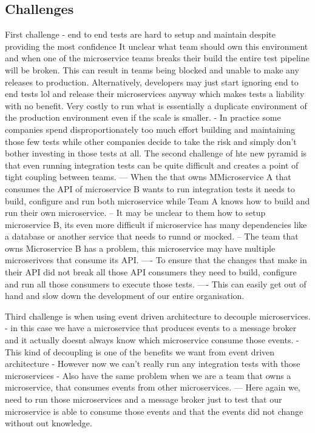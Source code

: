 \documentclass[a4paper, 11pt]{book}
\begin{document}
{    \subsection{Challenges}
    First challenge - end to end tests are hard to setup and maintain despite providing the most confidence
    It unclear what team should own this environment and when one of the microservice teams breaks their build the entire test pipeline will be broken.
    This can result in teams being blocked and unable to make any releases to production.
    Alternatively, developers may just start ignoring end to end tests lol and release their microservices anyway which makes tests a liability with no benefit.
    Very costly to run what is essentially a duplicate environment of the production environment even if the scale is smaller.
    - In practice some companies spend disproportionately too much effort building and maintaining those few tests while other companies decide to take the risk and simply don't bother investing in those tests at all.
    The second challenge of hte new pyramid is that even running integration tests can be quite difficult and creates a point of tight coupling between teams.
    --- When the that owns MMicroservice A that consumes the API of microservice B wants to run integration tests it needs to build, configure and run both microservice while Team A knows how to build and run their own microservice.
    -- It may be unclear to them how to setup microservice B, its even more difficult if microservice has many dependencies like a database or another service that needs to runnd or mocked.
    -- The team that owns Microservice B has a problem, this microservice may have multiple microserivces that consume its API.
    ---- To ensure that the changes that make in their API did not break all those API consumers they need to build, configure and run all those consumers to execute those tests.
    ---- This can easily get out of hand and slow down the development of our entire organisation.

    Third challenge is when using event driven architecture to decouple microservices.
    - in this case we have a microservice that produces events to a message broker and it actually doesnt always know which microservice consume those events.
    - This kind of decoupling is one of the benefits we want from event driven architecture
    - However now we can't really run any integration tests with those microservices
    - Also have the same problem when we are a team that owns a microservice, that consumes events from other microservices.
    --- Here again we, need to run those microservices and a message broker just to test that our microservice is able to consume those events and that the events did not change without out knowledge.

}
\end{document}
